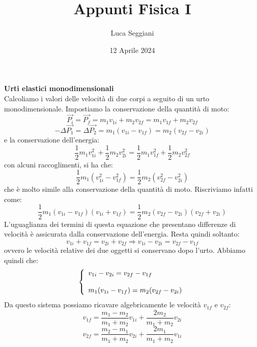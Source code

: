 \documentclass[a4paper,12pt]{article}
\title{Appunti Fisica I}
\author{Luca Seggiani}
\date{12 Aprile 2024}
\begin{document}
\maketitle
\textbf{Urti elastici monodimensionali} \\
Calcoliamo i valori delle velocità di due corpi a seguito di un urto monodimensionale. Impostiamo la conservazione della quantità
di moto:
$$ \vec{P_i} = \vec{P_f} = m_1v_{1i} + m_2v_{2f} = m_1v_{1f} + m_2v_{2f} $$
$$ -\Delta\vec{P_1} = \Delta\vec{P_2} = m_1(v_{1i} - v_{1f}) = m_2(v_{2f} - v_{2i}) $$
e la conservazione dell'energia:
$$ \frac{1}{2}m_1v_{1i}^2 + \frac{1}{2}m_2v_{2i}^2 = \frac{1}{2}m_1v_{1f}^2 + \frac{1}{2}m_2v_{2f}^2 $$
con alcuni raccoglimenti, si ha che:
$$ \frac{1}{2}m_1(v_{1i}^2 - v_{1f}^2) = \frac{1}{2}m_2(v_{2f}^2 - v_{2i}^2) $$
che è molto simile alla conservazione della quantità di moto. Riscriviamo infatti come:
$$ \frac{1}{2}m_1(v_{1i} - v_{1f})(v_{1i} + v_{1f}) = \frac{1}{2}m_2(v_{2f} - v_{2i})(v_{2f} + v_{2i})$$
L'uguaglianza dei termini di questa equazione che presentano differenze di velocità è assicurata dalla conservazione
dell'energia. Resta quindi soltanto:
$$ v_{1i} + v_{1f} = v_{2i} + v_{2f} \Rightarrow v_{1i} - v_{2i} = v_{2f} - v_{1f} $$
ovvero le velocità relative dei due oggetti si conservano dopo l'urto. Abbiamo quindi che:
$$ 
\left\{\begin{array}{l}
  v_{1i} - v_{2i} = v_{2f} - v_{1f} \cr \\
  m_1(v_{1i} - v_{1f}) = m_2(v_{2f} - v_{2i}) \cr
\end{array}\right.
$$
Da questo sistema possiamo ricavare algebricamente le velocità $v_{1f}$ e $v_{2f}$:
$$ v_{1f} = \frac{m_1-m_2}{m_1+m_2}v_{1i} + \frac{2m_2}{m_1+m_2}v_{2i} $$
$$ v_{2f} = \frac{m_2-m_1}{m_1+m_2}v_{2i} + \frac{2m_1}{m_1+m_2}v_{1i} $$
\end{document}
